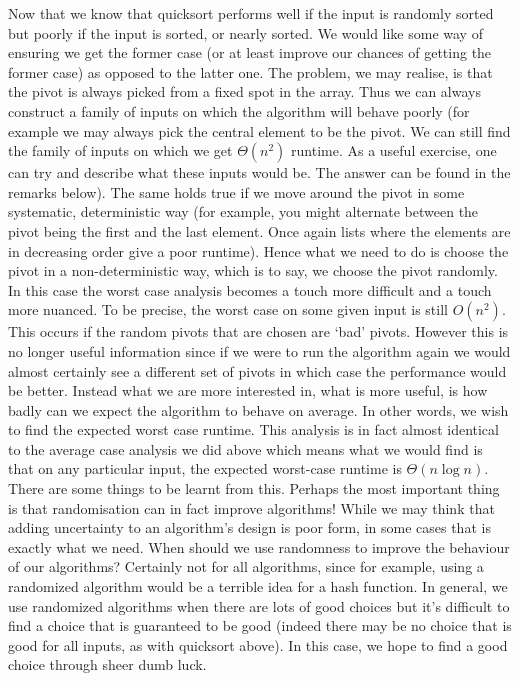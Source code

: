 Now that we know that quicksort performs well if the input is randomly sorted but poorly if the input is sorted, or nearly sorted. We would like some way of ensuring we get the former case (or at least improve our chances of getting the former case) as opposed to the latter one. The problem, we may realise, is that the pivot is always picked from a fixed spot in the array. Thus we can always construct a family of inputs on which the algorithm will behave poorly (for example we may always pick the central element to be the pivot. We can still find the family of inputs on which we get $\Theta(n^2)$ runtime. As a useful exercise, one can try and describe what these inputs would be. The answer can be found in the remarks below). The same holds true if we move around the pivot in some systematic, deterministic way (for example, you might alternate between the pivot being the first and the last element. Once again lists where the elements are in decreasing order give a poor runtime). Hence what we need to do is choose the pivot in a non-deterministic way, which is to say, we choose the pivot randomly. In this case the worst case analysis becomes a touch more difficult and a touch more nuanced. To be precise, the worst case on some given input is still $O(n^2)$. This occurs if the random pivots that are chosen are `bad' pivots. However this is no longer useful information since if we were to run the algorithm again we would almost certainly see a different set of pivots in which case the performance would be better. Instead what we are more interested in, what is more useful, is how badly can we expect the algorithm to behave on average. In other words, we wish to find the expected worst case runtime. This analysis is in fact almost identical to the average case analysis we did above which means what we would find is that on any particular input, the expected worst-case runtime is $\Theta(n \log n)$.\\

There are some things to be learnt from this. Perhaps the most important thing is that randomisation can in fact improve algorithms! While we may think that adding uncertainty to an algorithm's design is poor form, in some cases that is exactly what we need. When should we use randomness to improve the behaviour of our algorithms? Certainly not for all algorithms, since for example, using a randomized algorithm would be a terrible idea for a hash function. In general, we use randomized algorithms when there are lots of good choices but it's difficult to find a choice that is guaranteed to be good (indeed there may be no choice that is good for all inputs, as with quicksort above). In this case, we hope to find a good choice through sheer dumb luck.

